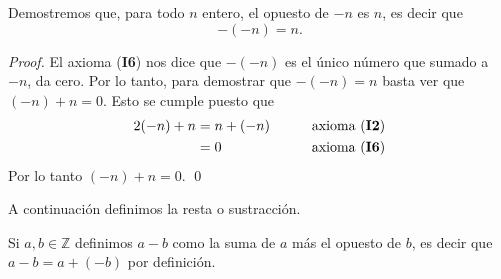 \documentclass[handout]{beamer} %
\begin{document}



\begin{frame}\begin{ejemplo}\label{Ej.opuesto_opuesto} Demostremos que, para todo $n$ entero, el opuesto de $-n$ es $n$, es decir que 
    $$-(-n) = n.$$ 
    \end{ejemplo}\pause
    \begin{proof}\pause El axioma (\textbf{I6}) nos dice que $-(-n)$ es el único número que sumado a $-n$, da cero.  Por lo tanto, para demostrar que $-(-n) = n$ basta ver que $(-n)+n=0$. \pause Esto se cumple puesto que 
    \begin{alignat*}2
    (-n)+n&=n+(-n) &\qquad &\text{axioma (\textbf{I2})} \\
    &=0&\qquad &\text{axioma (\textbf{I6})}
    \end{alignat*}\pause
    Por lo tanto  $(-n)+n=0$. \qed
    \end{proof}
	
\end{frame}


\begin{frame} 
    
    A continuación definimos la resta o sustracción. \pause

    \begin{definicion} Si $a,b\in\mathbb{Z}$ definimos $a-b$ como la suma de $a$ más el opuesto de $b$, es decir que  $a-b=a+(-b)$ por definición.  
    \end{definicion}
    
    
    
	
\end{frame}
\end{document}
